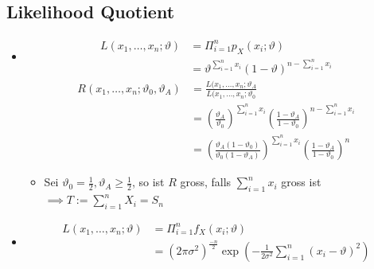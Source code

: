 \subsection{Likelihood Quotient}
\begin{itemize}
    \item
        \begin{itemize}
                \begin{align*}
                    L(x_1, \dots, x_n;\vartheta) &= \Pi_{i=1}^n p_X(x_i;\vartheta)\\
                                                 &= \vartheta^{\sum_{i=1}^n x_i}(1 - \vartheta)^{n - \sum_{i=1}^n x_i}
                \end{align*}
                \begin{align*}
                    R(x_1, \dots, x_n; \vartheta_0, \vartheta_A) &= \frac{L(x_1, \dots, x_n; \vartheta_A}{L(x_1, \dots, x_n; \vartheta_0}\\
                                                                 &= \left( \frac{\vartheta_A}{\vartheta_0} \right)^{\sum_{i=1}^n x_i} \left(\frac{1 - \vartheta_A}{1 - \vartheta_0} \right)^{n - \sum_{i = 1}^n x_i}\\
                                                                 &= \left( \frac{\vartheta_A (1 - \vartheta_0)}{\vartheta_0 (1 - \vartheta_A)} \right)^{\sum_{i=1}^n x_i} \left(\frac{1 - \vartheta_A}{1 - \vartheta_0} \right)^n
                \end{align*}
                    \begin{itemize}
                        \item Sei $\vartheta_0 = \frac{1}{2}, \vartheta_A \ge \frac{1}{2}$, so ist $R$ gross, falls $\sum_{i=1}^n x_i$ gross ist $\implies T := \sum_{i=1}^n X_i = S_n$
                    \end{itemize}
        \end{itemize}
    \item
        \begin{itemize}
                \begin{align*}
                    L(x_1, \dots, x_n;\vartheta) &= \Pi_{i=1}^n f_X(x_i;\vartheta)\\
                                                 &= (2 \pi \sigma^2)^{\frac{-n}{2}} \exp \left(- \frac{1}{2 \sigma^2} \sum_{i=1}^n (x_i -\vartheta)^2 \right)
                \end{align*}

\end{itemize}
\end{itemize}
